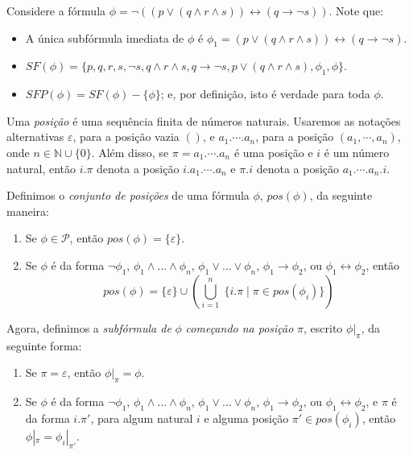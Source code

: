 \begin{example}
	Considere a fórmula $\phi = \neg((p \vee (q \wedge r \wedge s)) \leftrightarrow (q \rightarrow \neg s))$. Note que:
	\begin{itemize}
		\item A única subfórmula imediata de $\phi$ é $\phi_1 = (p \vee (q \wedge r \wedge s)) \leftrightarrow (q \rightarrow \neg s)$.
		\item $SF(\phi) = \{p,q,r,s,\neg s,q \wedge r \wedge s,q \rightarrow \neg s,p \vee (q \wedge r \wedge s),\phi_1,\phi \}$.
		\item $SFP(\phi) = SF(\phi) - \{\phi \}$; e, por definição, isto é verdade para toda $\phi$.
	\end{itemize}
\end{example}

\begin{definition}
	Uma \emph{posição} é uma sequência finita de números naturais. Usaremos as notações alternativas $\varepsilon$, para a posição vazia $()$, e $a_1.\cdots.a_n$, para a posição $(a_1,\cdots,a_n)$, onde $n \in \mathbb{N} \cup \{0\}$. Além disso, se $\pi = a_1.\cdots.a_n$ é uma posição e $i$ é um número natural, então $i.\pi$ denota a posição $i.a_1.\cdots.a_n$ e $\pi.i$ denota a posição $a_1.\cdots.a_n.i$.
	
    Definimos o \emph{conjunto de posições} de uma fórmula $\phi$, $pos(\phi)$, da seguinte maneira:
    \begin{enumerate}
        \item Se $\phi \in \mathcal{P}$, então $pos(\phi) = \{\varepsilon\}$.
        \item Se $\phi$ é da forma $\neg \phi_1$, $\phi_1 \wedge ... \wedge \phi_n$, $\phi_1 \vee ... \vee \phi_n$, $\phi_1 \rightarrow \phi_2$, ou $\phi_1 \leftrightarrow \phi_2$, então $$pos(\phi) = \{\varepsilon\} \cup \left(\bigcup_{i=1}^{n} \; \{i.\pi \mid \pi \in pos(\phi_i)\}\right)$$
    \end{enumerate}
    
    Agora, definimos a \emph{subfórmula de} $\phi$ \emph{começando na posição} $\pi$, escrito $\phi|_\pi$, da seguinte forma:
    \begin{enumerate}
        \item Se $\pi = \varepsilon$, então $\phi|_\pi = \phi$.
        \item Se $\phi$ é da forma $\neg \phi_1$, $\phi_1 \wedge ... \wedge \phi_n$, $\phi_1 \vee ... \vee \phi_n$, $\phi_1 \rightarrow \phi_2$, ou $\phi_1 \leftrightarrow \phi_2$, e $\pi$ é da forma $i.\pi'$, para algum natural $i$ e alguma posição $\pi' \in pos(\phi_i)$, então $\phi|_\pi = \phi_i|_{\pi'}$.
    \end{enumerate}
\end{definition}

